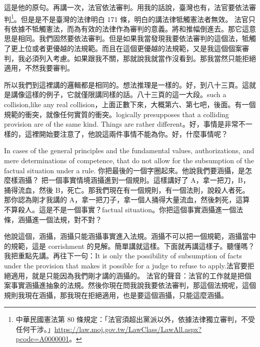 \hypertarget{w05:cue:295}{}這是他的原句。再講一次，法官依法審判。用我的話說，臺灣也有，法官要依法審判\footnote{中華民國憲法第 80 條規定：「法官須超出黨派以外，依據法律獨立審判，不受任何干涉。」\url{https://law.moj.gov.tw/LawClass/LawAll.aspx?pcode=A0000001}。}。但是是不是臺灣的法律明白 171 條，明白的講法律牴觸憲法者無效。
\hypertarget{w05:cue:296}{}法官只有依據不牴觸憲法，而為有效的法律作為審判的意義。將和推幅倒進去。那它這意思是相同。我們固然要依法審判。但是如果我當發現我要依法審判的這個法，牴觸了更上位或者更優越的法規範。而且在這個更優越的法規範，又是我這個個案審判，我必須列入考慮。如果跟我不關，那就說我就當作沒看到。那我當然只能拒絕適用，不然我要審判。

\hypertarget{w05:cue:297}{}所以我們到這裡講的邏輯都是相同的。想法推理是一樣的。好，到八十三頁。這就是講像這樣的例子，它就僅限講同樣的話。八十三頁的這一大段。such a collision,like any real collision，上面正數下來，大概第六、第七吧，後面。有一個規範的衝突，就像任何實質的衝突。logically presupposes that a colliding provision are of the same kind.
\hypertarget{w05:cue:298}{}Things are rather different。好，事情是非常不一樣的，這裡開始要注意了，他說這兩件事情不能為你。好，什麼事情呢？

\hypertarget{w05:cue:299}{}In cases of the general principles and the fundamental values, authorizations, and mere determinations of competence, that do not allow for the subsumption of the factual situation under a rule.
\hypertarget{w05:cue:300}{}你把最後的一個字圈起來。他說我們要涵攝，是怎麼樣涵攝？
\hypertarget{w05:cue:301}{}把一個事實情境涵攝進到一個規則。這樣講好了 A，拿一把刀，B，捅得流血，然後 B，死亡。那我們現在有一個規則，有一個法則，說殺人者死。那你認為剛才我講的 A，拿一把刀子，拿一個人捅得大量流血，然後刺死，這算不算殺人。這是不是一個事實？factual situation。你把這個事實涵攝進一個法條，涵攝進一個法規，對不對？

\hypertarget{w05:cue:302}{}他說這個，涵攝，涵攝只能涵攝事實進入法規。涵攝不可以把一個規範，涵攝當中的規範，這是 corrishment 的見解。簡單講就這樣。下面就再講這樣子。聽懂嗎？我把重點先講。再往下一句：It is only the possibility of subsumption of facts under the provision that makes it possible for a judge to refuse to apply.法官要拒絕適用，就是只能因為我們剛才講的涵攝的。
\hypertarget{w05:cue:303}{}法官的聲音：法官的工作就是把個案事實涵攝進抽象的法規。然後你現在問我說我要依法審判，那這個法規呢，這個規則我現在涵攝，那我現在拒絕適用，也是要這個涵攝，只能這麼涵攝。

